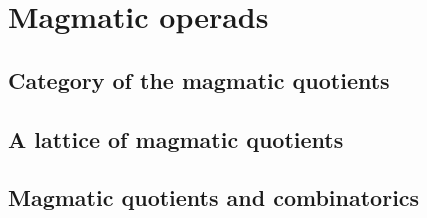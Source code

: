 \section{Magmatic operads}

\subsection{Category of the magmatic quotients}

\subsection{A lattice of magmatic quotients}

\subsection{Magmatic quotients and combinatorics}

